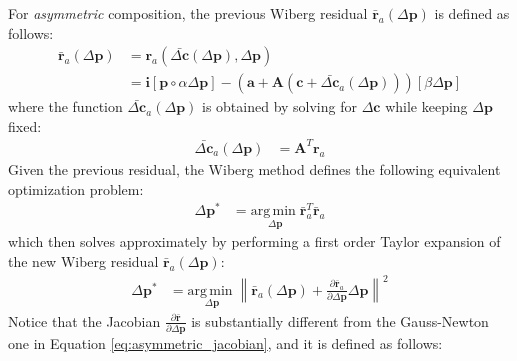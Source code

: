 For \emph{asymmetric} composition, the previous Wiberg residual $\bar{\mathbf{r}}_a (\Delta \mathbf{p})$ is defined as follows:
\begin{equation}
    \begin{aligned}
        \bar{\mathbf{r}}_a (\Delta \mathbf{p}) & = \mathbf{r}_a(\bar{\Delta \mathbf{c}}(\Delta \mathbf{p}), \Delta \mathbf{p})
        \\ 
        & = \mathbf{i}[\mathbf{p} \circ \alpha \Delta \mathbf{p}] - (\mathbf{a} + \mathbf{A}(\mathbf{c} + \bar{\Delta \mathbf{c}}_a(\Delta \mathbf{p}))) [\beta \Delta\mathbf{p}]
    \label{eq:asymmetric_wiberg_residual}
    \end{aligned}
\end{equation}
where the function $\bar{\Delta \mathbf{c}}_a(\Delta \mathbf{p})$ is obtained by solving for $\Delta\mathbf{c}$ while keeping $\Delta\mathbf{p}$ fixed:
\begin{equation}
    \begin{aligned}
        \bar{\Delta \mathbf{c}}_a(\Delta \mathbf{p}) & = \mathbf{A}^T \mathbf{r}_a
        \label{eq:asymmetric_wiberg_c_function}
    \end{aligned}
\end{equation}
Given the previous residual, the Wiberg method defines the following equivalent optimization problem:
\begin{equation}
    \begin{aligned}
        \Delta\mathbf{p}^* & = \underset{\Delta\mathbf{p}}{\mathrm{arg\,min\;}} \bar{\mathbf{r}}_a^T\bar{\mathbf{r}}_a
    \label{eq:asymmetric_wiberg_problem1}
    \end{aligned}
\end{equation}
which then solves approximately by performing a first order Taylor expansion of the new Wiberg residual $\bar{\mathbf{r}}_a (\Delta \mathbf{p})$:
\begin{equation}
    \begin{aligned}
        \Delta\mathbf{p}^* & = \underset{\Delta\mathbf{p}}{\mathrm{arg\,min\;}}  \left\| \bar{\mathbf{r}}_a(\Delta\mathbf{p}) + \frac{\partial \bar{\mathbf{r}}_a}{\partial\Delta\mathbf{p}} \Delta\mathbf{p} \right\|^2
    \label{eq:asymmetric_wiberg_problem2}
    \end{aligned}
\end{equation}
Notice that the Jacobian $\frac{\partial\bar{\mathbf{r}}}{\partial\Delta\mathbf{p}}$ is substantially different from the Gauss-Newton one in Equation \ref{eq:asymmetric_jacobian}, and it is defined as follows:
